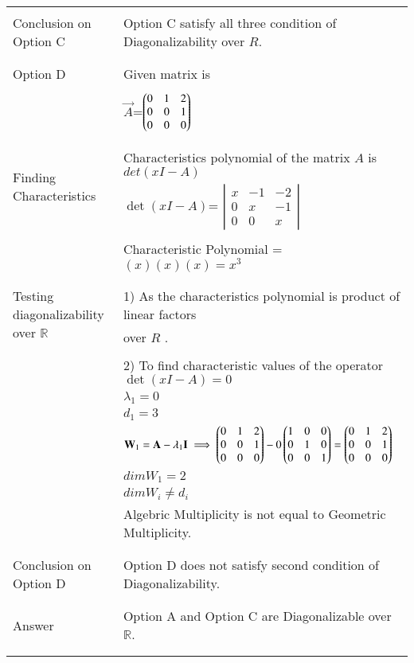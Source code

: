 \documentclass[journal,12pt]{IEEEtran}
\begin{document}
\begin{longtable}{|l|l|}
\hline
\multirow{3}{*}{Conclusion on Option C} & \\
& Option C satisfy all three condition of Diagonalizability over $R$. \\
&\\
\hline\hline
\multirow{3}{*}{Option D} & \\
& Given matrix is  \\
&\\
& $\vec{A}$=$\begin{pmatrix}0&1&2\\0&0&1\\0&0&0\end{pmatrix}$\\
&\\
\hline
\multirow{3}{*}{Finding Characteristics} & \\
&
Characteristics polynomial of the matrix $A$ is $det(xI-A)$\\ 
polynomial
& $\det(xI-A)$= $\left|
                \begin{array}{ccc}
                x & -1 & -2\\
                0 & x & -1\\
                0 & 0 & x
                \end{array} \right|$  \\
&\\
& Characteristic Polynomial = $(x)(x)(x)=x^3$\\
&\\
\hline
\multirow{3}{*}{Testing diagonalizability over $\mathbb{R}$} & \\
& 1) As the characteristics  polynomial is product of linear factors\\
&over $R$ .\\
&\\
&2) To find characteristic values of the operator $\det(xI-A) = 0$ \\
& $\lambda_1= 0$\\
&$d_1=3$\\
&$\mathbf{W}_1=\mathbf{A}-\lambda_1\mathbf{I}\implies\begin{pmatrix}0&1&2\\0&0&1\\0&0&0\end{pmatrix}-0\begin{pmatrix}1&0&0\\0&1&0\\0&0&1\end{pmatrix}=\begin{pmatrix}0&1&2\\0&0&1\\0&0&0\end{pmatrix}$\\

&$dim W_1 = 2$\\
&$dim W_i \neq d_i$\\
&Algebric Multiplicity is not equal to Geometric Multiplicity.\\
&\\
\hline
\multirow{3}{*}{Conclusion on Option D} & \\
& Option D  does not satisfy second condition of Diagonalizability. \\
&\\
\hline \hline
\multirow{3}{*}{Answer} & \\
&Option A and Option C are Diagonalizable over $\mathbb{R}$.\\
&\\
\hline



\label{table:2}
\end{longtable}
\end{document}
